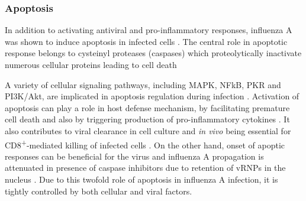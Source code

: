		\subsubsection{Apoptosis}
		
		In addition to activating antiviral and pro-inflammatory responses, influenza A was shown to induce apoptosis in infected cells \parencite{Fesq1994, Hinshaw1994, Mori1995, Brydon2005}. The central role in apoptotic response belongs to cysteinyl proteases (caspases) which proteolytically inactivate numerous cellular proteins leading to cell death \parencite{Cohen1997, Thornberry1998}	
		
		A variety of cellular signaling pathways, including \gls{MAPK}, \gls{NFkB}, \gls{PKR} and \gls{PI3K}/Akt, are implicated in apoptosis regulation during infection \parencite{Gil2000, Xing2010, Lu2010}. Activation of apoptosis can play a role in host defense mechanism, by facilitating premature cell death and also by triggering production of pro-inflammatory cytokines \parencite{Julkunen2000}. It also contributes to viral clearance in cell culture and \textit{in vivo} being essential for CD8\textsuperscript{+}-mediated killing of infected cells \parencite{Ishikawa2005, Brincks2008}. On the other hand, onset of apoptic responses can be beneficial for the virus and influenza A propagation is attenuated in presence of caspase inhibitors due to retention of vRNPs in the nucleus \parencite{Wurzer2003}. Due to this twofold role of apoptosis in influenza A infection, it is tightly controlled by both cellular and viral factors.
			
		
